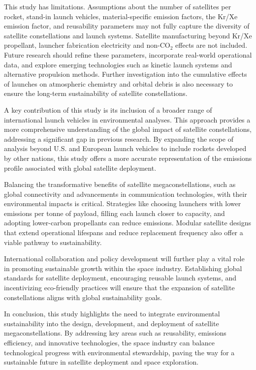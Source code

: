 \documentclass[pdflatex,sn-mathphys-num]{sn-jnl}
\theoremstyle{thmstyleone}%
\theoremstyle{thmstyletwo}%
\theoremstyle{thmstylethree}%
\begin{document}
This study has limitations. Assumptions about the number of satellites per rocket, stand-in launch vehicles, material-specific emission factors, the Kr/Xe emission factor, and reusability parameters may not fully capture the diversity of satellite constellations and launch systems. Satellite manufacturing beyond Kr/Xe propellant, launcher fabrication electricity and non-CO$_2$ effects are not included. Future research should refine these parameters, incorporate real-world operational data, and explore emerging technologies such as kinetic launch systems and alternative propulsion methods. Further investigation into the cumulative effects of launches on atmospheric chemistry and orbital debris is also necessary to ensure the long-term sustainability of satellite constellations.

A key contribution of this study is its inclusion of a broader range of international launch vehicles in environmental analyses. This approach provides a more comprehensive understanding of the global impact of satellite constellations, addressing a significant gap in previous research. By expanding the scope of analysis beyond U.S. and European launch vehicles to include rockets developed by other nations, this study offers a more accurate representation of the emissions profile associated with global satellite deployment.

Balancing the transformative benefits of satellite megaconstellations, such as global connectivity and advancements in communication technologies, with their environmental impacts is critical. Strategies like choosing launchers with lower emissions per tonne of payload, filling each launch closer to capacity, and adopting lower-carbon propellants can reduce emissions. Modular satellite designs that extend operational lifespans and reduce replacement frequency also offer a viable pathway to sustainability.

International collaboration and policy development will further play a vital role in promoting sustainable growth within the space industry. Establishing global standards for satellite deployment, encouraging reusable launch systems, and incentivizing eco-friendly practices will ensure that the expansion of satellite constellations aligns with global sustainability goals.

In conclusion, this study highlights the need to integrate environmental sustainability into the design, development, and deployment of satellite megaconstellations. By addressing key areas such as reusability, emissions efficiency, and innovative technologies, the space industry can balance technological progress with environmental stewardship, paving the way for a sustainable future in satellite deployment and space exploration.
\end{document}
